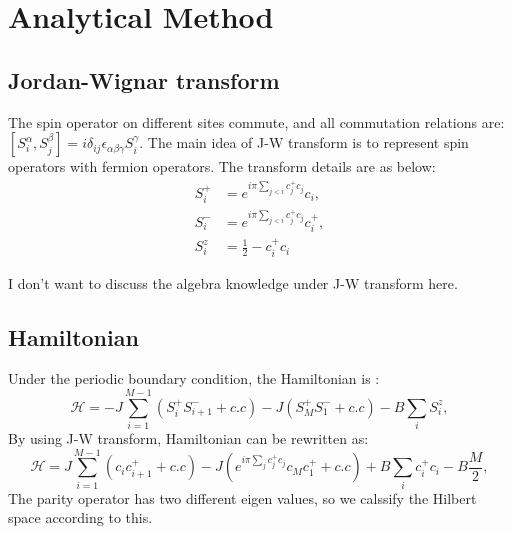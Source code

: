 \documentclass[UTF8]{ctexart}
\begin{document}
\section{Analytical Method}
\subsection{Jordan-Wignar transform}
The spin operator on different sites commute, and all commutation relations are: $[S_i^{\alpha},S_j^{\beta}]=i\delta_{ij}\epsilon_{\alpha\beta\gamma}S_i^\gamma$. The main idea of J-W transform is to represent spin operators with fermion operators. The transform details are as below:
\begin{subequations}
\begin{align}
\label{2}
S_i^+&=e^{i\pi\sum_{j<i}c_j^+c_j}c_i,\\
S_i^-&=e^{i\pi\sum_{j<i}c_j^+c_j}c_i^+,\\
S_i^z&=\frac{1}{2}-c_i^+c_i
\end{align}
\end{subequations}
\par
I don't want to discuss the algebra knowledge under J-W transform here.
\subsection{Hamiltonian}
Under the periodic boundary condition, the Hamiltonian is :
\begin{equation}
\label{3}
\mathcal{H}=-J\sum_{i=1}^{M-1}(S_i^+S_{i+1}^-+c.c)-J(S_M^+S_1^-+c.c)-B\sum_{i}S_i^z,
\end{equation}
By using J-W transform, Hamiltonian can be rewritten as:
\begin{equation}
\mathcal{H}=J\sum_{i=1}^{M-1}(c_ic_{i+1}^++c.c)-J(e^{i\pi\sum_{j}c_j^+c_j}c_Mc_1^++c.c)+B\sum_{i}c_i^+c_i-B\frac{M}{2},
\end{equation}
The parity operator has two different eigen values, so we calssify the Hilbert space according to this.
\end{document}
